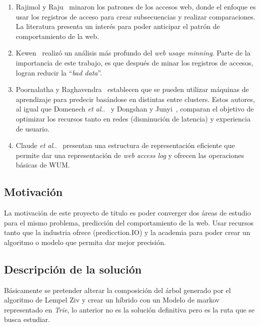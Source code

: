 \documentclass{udparticle}
\makeatletter
\DeclareRobustCommand\onedot{\futurelet\@let@token\@onedot}
\newcommand\@onedot{\ifx\@let@token.\else.\null\fi\xspace}
\newcommand\etal{\emph{et al}\onedot}
\makeatother
\begin{document}
\begin{enumerate}
  \item Rajimol y Raju~\cite{rajimol2012} minaron los patrones de los accesos web, donde el enfoque es usar los registros de acceso para crear subsecuencias y realizar comparaciones.
  La literatura presenta un interés para poder anticipar el patrón de comportamiento de la web.

  \item Kewen~\cite{kewen2012} realizó un análisis más profundo del \emph{web usage minning}.
  Parte de la importancia de este trabajo, es que después de minar los registros de accesos, logran reducir la ``\emph{bad data}''.

  \item Poornalatha y Raghavendra~\cite{Poornalatha2012} establecen que se pueden utilizar máquinas de aprendizaje para predecir basándose en distintas entre clusters. Estos autores, al igual que Domenech \etal~\cite{Domenech2006} y Dongshan y Junyi~\cite{Dongshan2002}, comparan el objetivo de optimizar los recursos tanto en redes (disminución de latencia) y experiencia de usuario.

  \item Claude \etal~\cite{Claude2014} presentan una estructura de representación eficiente que permite dar una representación de \emph{web access log} y ofrecen las operaciones básicas de WUM.
\end{enumerate}


\subsection{Motivación}

La motivación de este proyecto de titulo es poder converger dos áreas de estudio para el mismo problema, predicción del comportamiento de la web. Usar recursos tanto que la industria ofrece (predicction.IO) y la academia para poder crear un algoritmo o modelo que permita dar mejor precisión.


\subsection{Descripción de la solución }

Básicamente se pretender alterar la composición del árbol generado por el algoritmo de Lempel Ziv y crear un híbrido con un Modelo de markov representado en \emph{Trie}, lo anterior no es la solución definitiva pero es la ruta que se busca estudiar.
\end{document}
